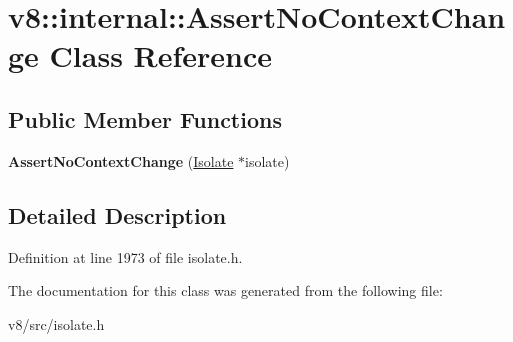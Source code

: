 \hypertarget{classv8_1_1internal_1_1AssertNoContextChange}{}\section{v8\+:\+:internal\+:\+:Assert\+No\+Context\+Change Class Reference}
\label{classv8_1_1internal_1_1AssertNoContextChange}
\subsection*{Public Member Functions}
\begin{DoxyCompactItemize}
\item 
\mbox{\label{classv8_1_1internal_1_1AssertNoContextChange_aede74e893397757a029448029be9fd42}} 
{\bfseries Assert\+No\+Context\+Change} (\mbox{\hyperlink{classv8_1_1internal_1_1Isolate}{Isolate}} $\ast$isolate)
\end{DoxyCompactItemize}


\subsection{Detailed Description}


Definition at line 1973 of file isolate.\+h.



The documentation for this class was generated from the following file\+:\begin{DoxyCompactItemize}
\item 
v8/src/isolate.\+h\end{DoxyCompactItemize}
